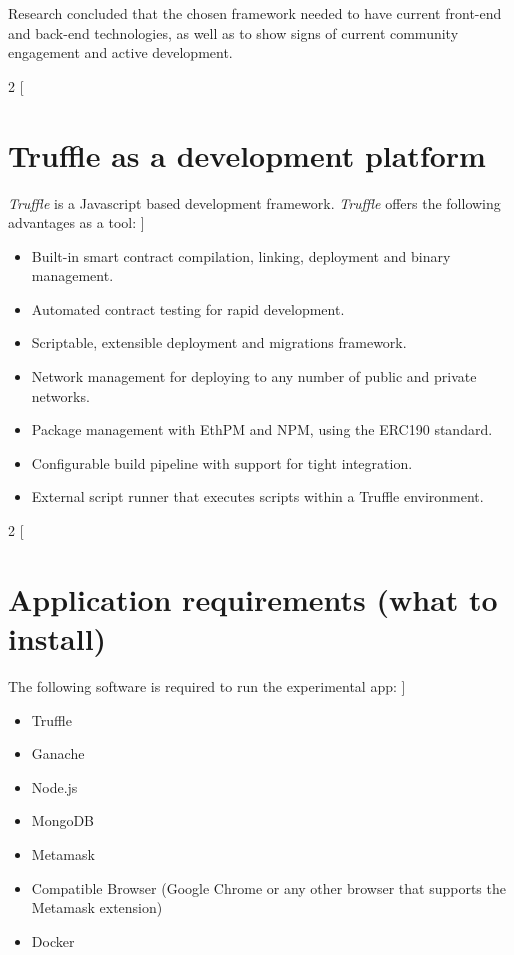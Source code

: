 \documentclass[submission,copyright,creativecommons]{eptcs}
\begin{document}
Research concluded that the chosen framework needed to have current front-end and back-end technologies, as well as to show signs of current community engagement and active development.  
\begin{multicols}{2}
[
\section{Truffle as a development platform}
\textit{Truffle} is a Javascript based development framework\cite{TruffleDocumentation}. \textit{Truffle} offers the following advantages as a tool:
]
\begin{itemize}
    \item Built-in smart contract compilation, linking, deployment and binary management.
    \item Automated contract testing for rapid development.
    \item Scriptable, extensible deployment and migrations framework.
    \item Network management for deploying to any number of public and private networks.
    \item Package management with EthPM and NPM, using the ERC190 standard.
    \item Configurable build pipeline with support for tight integration.
    \item External script runner that executes scripts within a Truffle environment.
\end{itemize}
\end{multicols}

\begin{multicols}{2}
[
\section{Application requirements (what to install)}
The following software is required to run the experimental app:
]
\begin{itemize}
\item Truffle
\item Ganache
\item Node.js
\item MongoDB
\item Metamask
\item Compatible Browser (Google Chrome or any other browser that supports the Metamask extension)
\item Docker
\end{itemize}
\end{multicols}
\end{document}
